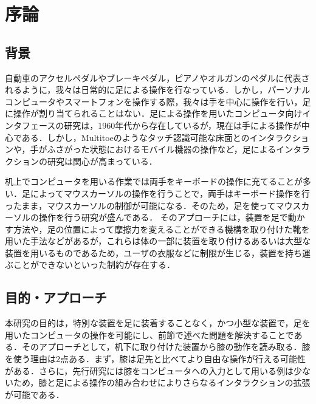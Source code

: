 \chapter{序論}

\section{背景}
自動車のアクセルペダルやブレーキペダル，ピアノやオルガンのペダルに代表されるように，我々は日常的に足による操作を行なっている．しかし，パーソナルコンピュータやスマートフォンを操作する際，我々は手を中心に操作を行い，足に操作が割り当てられることはない．足による操作を用いたコンピュータ向けインタフェースの研究は，1960年代から存在している\cite{1698228}が，現在は手による操作が中心である．しかし，Multitoe\cite{Augsten:2010:MHI:1866029.1866064}のようなタッチ認識可能な床面とのインタラクションや，手がふさがった状態におけるモバイル機器の操作\cite{Fan:2017:ESF:3123021.3123043, okumura_2011}など，足によるインタラクションの研究は関心が高まっている．\par
机上でコンピュータを用いる作業では両手をキーボードの操作に充てることが多い．足によってマウスカーソルの操作を行うことで，両手はキーボード操作を行ったまま，マウスカーソルの制御が可能になる．そのため，足を使ってマウスカーソルの操作を行う研究が盛んである．
%
そのアプローチには，装置を足で動かす方法\cite{Pearson:1986:MMD:22627.22392, Pearson:1988:EET:49108.1046356}や，足の位置によって摩擦力を変えることができる機構を取り付けた靴\cite{Horodniczy:2017:FHE:3025453.3025625}を用いた手法などがあるが，これらは体の一部に装置を取り付けるあるいは大型な装置を用いるものであるため，ユーザの衣服などに制限が生じる，装置を持ち運ぶことができないといった制約が存在する．



\section{目的・アプローチ}
本研究の目的は，特別な装置を足に装着することなく，かつ小型な装置で，足を用いたコンピュータの操作を可能にし、前節で述べた問題を解決することである．そのアプローチとして，机下に取り付けた装置から膝の動作を読み取る．膝を使う理由は2点ある．まず，膝は足先と比べてより自由な操作が行える可能性がある．さらに，先行研究には膝をコンピュータへの入力として用いる例は少ない\cite{1698228}ため，膝と足による操作の組み合わせによりさらなるインタラクションの拡張が可能である．

